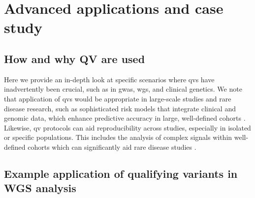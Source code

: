 \section{Advanced applications and case study}
\subsection{How and why QV are used}
Here we provide an in-depth look at specific scenarios where \ac{qv}s  have inadvertently been crucial, such as in \ac{gwas}, \ac{wgs}, and clinical genetics. 
We note that application of \ac{qv}s would be appropriate in large-scale studies and rare disease research, such as sophisticated risk models that integrate clinical and genomic data, which enhance predictive accuracy in large, well-defined cohorts \cite{riveros2021integrated, weale2021validation, sun2021polygenic}.
Likewise, \ac{qv} protocols can aid reproducibility across studies, especially in isolated or specific populations. This includes the analysis of complex signals within well-defined cohorts which can significantly aid rare disease studies \cite{lim2014distribution}. %

\subsection{Example application of qualifying variants in WGS analysis}

